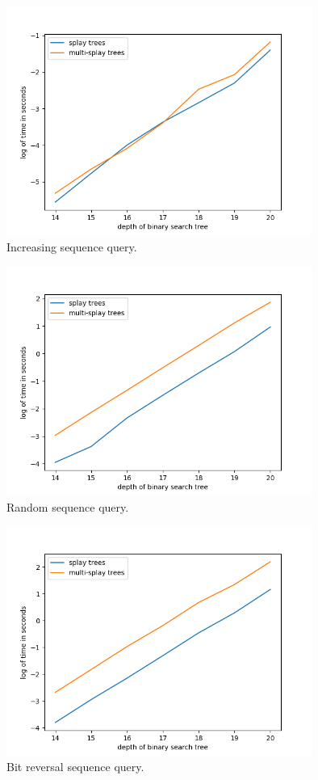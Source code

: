 \documentclass{article}
\begin{document}
\begin{figure}[h!]
    \centering
    \includegraphics[width = 10cm]{increasing}
    \caption{Increasing sequence query.}
    \label{fig:my_label}
\end{figure}

\begin{figure}[h!]
    \centering
    \includegraphics[width = 10cm]{random}
    \caption{Random sequence query.}
    \label{fig:my_label}
\end{figure}

\begin{figure}[h!]
    \centering
    \includegraphics[width = 10cm]{reversal}
    \caption{Bit reversal sequence query.}
    \label{fig:my_label}
\end{figure}
\end{document}
